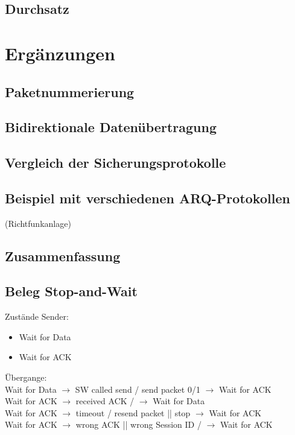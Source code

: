 \subsection{Durchsatz}

\section{Ergänzungen}
\subsection{Paketnummerierung}
\subsection{Bidirektionale Datenübertragung}
\subsection{Vergleich der Sicherungsprotokolle}
\subsection{Beispiel mit verschiedenen ARQ-Protokollen}
(Richtfunkanlage)
\subsection{Zusammenfassung}
\subsection{Beleg Stop-and-Wait}
Zustände Sender:
\begin{itemize}
\item Wait for Data
\item Wait for ACK
\end{itemize}
Übergange:\\
Wait for Data $\to$ SW called send / send packet 0/1 $\to$ Wait for ACK\\
Wait for ACK $\to$ received ACK /  $\to$ Wait for Data\\
Wait for ACK $\to$ timeout / resend packet || stop $\to$ Wait for ACK \\
Wait for ACK $\to$ wrong ACK || wrong Session ID / $\to$ Wait for ACK

